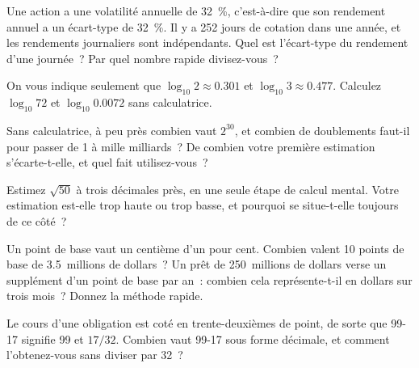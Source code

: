 \begin{question}\label{iq:iv1:mental-technique:13}
Une action a une volatilité annuelle de 32~\%, c'est-à-dire que son rendement annuel a un écart-type de 32~\%. Il y a 252 jours de cotation dans une année, et les rendements journaliers sont indépendants. Quel est l'écart-type du rendement d'une journée~? Par quel nombre rapide divisez-vous~?
\end{question}

\begin{question}\label{iq:iv1:mental-technique:14}
On vous indique seulement que $\log_{10} 2 \approx 0.301$ et $\log_{10} 3 \approx 0.477$. Calculez $\log_{10} 72$ et $\log_{10} 0.0072$ sans calculatrice.
\end{question}

\begin{question}\label{iq:iv1:mental-technique:15}
Sans calculatrice, à peu près combien vaut $2^{30}$, et combien de doublements faut-il pour passer de 1 à mille milliards~? De combien votre première estimation s'écarte-t-elle, et quel fait utilisez-vous~?
\end{question}

\begin{question}\label{iq:iv1:mental-technique:16}
Estimez $\sqrt{50}$ à trois décimales près, en une seule étape de calcul mental. Votre estimation est-elle trop haute ou trop basse, et pourquoi se situe-t-elle toujours de ce côté~?
\end{question}

\begin{question}\label{iq:iv1:mental-technique:17}
Un point de base vaut un centième d'un pour cent. Combien valent 10 points de base de 3.5~millions de dollars~? Un prêt de 250~millions de dollars verse un supplément d'un point de base par an~: combien cela représente-t-il en dollars sur trois mois~? Donnez la méthode rapide.
\end{question}

\begin{question}\label{iq:iv1:mental-technique:18}
Le cours d'une obligation est coté en trente-deuxièmes de point, de sorte que 99-17 signifie 99 et $17/32$. Combien vaut 99-17 sous forme décimale, et comment l'obtenez-vous sans diviser par 32~?
\end{question}

